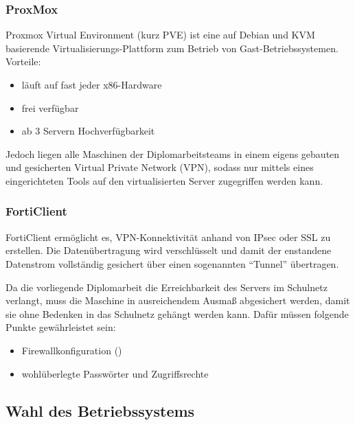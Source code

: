 \documentclass[
]{article}
\providecommand{\tightlist}{%
  \setlength{\itemsep}{0pt}\setlength{\parskip}{0pt}}
\begin{document}
\hypertarget{proxmox}{%
\subsubsection{ProxMox}\label{proxmox}}

Proxmox Virtual Environment (kurz PVE) ist eine auf Debian und KVM
basierende Virtualisierungs-Plattform zum Betrieb von
Gast-Betriebssystemen. Vorteile:

\begin{itemize}
\tightlist
\item
  läuft auf fast jeder x86-Hardware
\item
  frei verfügbar
\item
  ab 3 Servern Hochverfügbarkeit
\end{itemize}

Jedoch liegen alle Maschinen der Diplomarbeitsteams in einem eigens
gebauten und gesicherten Virtual Private Network (VPN), sodass nur
mittels eines eingerichteten Tools auf den virtualisierten Server
zugegriffen werden kann.

\hypertarget{forticlient}{%
\subsubsection{FortiClient}\label{forticlient}}

FortiClient ermöglicht es, VPN-Konnektivität anhand von IPsec oder SSL
zu erstellen. Die Datenübertragung wird verschlüsselt und damit der
enstandene Datenstrom vollständig gesichert über einen sogenannten
``Tunnel'' übertragen.

Da die vorliegende Diplomarbeit die Erreichbarkeit des Servers im
Schulnetz verlangt, muss die Maschine in ausreichendem Ausmaß
abgesichert werden, damit sie ohne Bedenken in das Schulnetz gehängt
werden kann. Dafür müssen folgende Punkte gewährleistet sein:

\begin{itemize}
\tightlist
\item
  Firewallkonfiguration ()
\item
  wohlüberlegte Passwörter und Zugriffsrechte
\end{itemize}

\hypertarget{wahl-des-betriebssystems}{%
\subsection{Wahl des Betriebssystems}\label{wahl-des-betriebssystems}}
\end{document}
